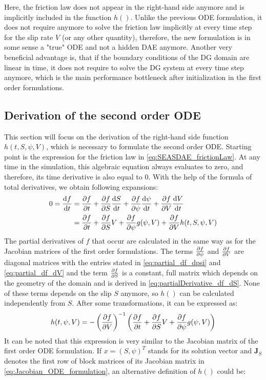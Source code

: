 Here, the friction law does not appear in the right-hand side anymore and is implicitly included in the function $h()$. Unlike the previous ODE formulation, it does not require anymore to solve the friction law implicitly at every time step for the slip rate $V$ (or any other quantity), therefore, the new formulation is in some sense a "true" ODE and not a hidden DAE anymore. Another very beneficial advantage is, that if the boundary conditions of the DG domain are linear in time, it does not require to solve the DG system at every time step anymore, which is the main performance bottleneck after initialization in the first order formulations. 

\subsection{Derivation of the second order ODE}
This section will focus on the derivation of the right-hand side function $h(t,S,\psi,V)$, which is necessary to formulate the second order ODE. Starting point is the expression for the friction law in \autoref{eq:SEASDAE_frictionLaw}. At any time in the simulation, this algebraic equation always evaluates to zero, and therefore, its time derivative is also equal to 0. With the help of the formula of total derivatives, we obtain following expansions: 
\begin{align}
	0 = \dv{f}{t} &= \pdv{f}{t} + \pdv{f}{S}\dv{S}{t} + \pdv{f}{\psi}\dv{\psi}{t} +  \pdv{f}{V}\dv{V}{t} \\
					  &= \pdv{f}{t} + \pdv{f}{S}V + \pdv{f}{\psi}g(\psi,V) + \pdv{f}{V}h(t,S,\psi,V)
\end{align}
The partial derivatives of $f$ that occur are calculated in the same way as for the Jacobian matrices of the first order formulations. The terms $\pdv{f}{\psi}$ and $\pdv{f}{V}$ are diagonal matrices with the entries stated in \autoref{eq:partial_df_dpsi} and \autoref{eq:partial_df_dV} and the term $\pdv{f}{S}$ is a constant, full matrix which depends on the geometry of the domain and is derived in \autoref{eq:partialDerivative_df_dS}. None of these terms depends on the slip $S$ anymore, so $h()$ can be calculated independently from $S$. After some transformations, it can be expressed as: 
\begin{equation}
	\label{eq:2nd_order_ODE_formulation_sum_of_Jacobians}
	h(t,\psi,V) = -\left(\pdv{f}{V}\right)^{-1}\left(\pdv{f}{t} + \pdv{f}{S}V + \pdv{f}{\psi}g(\psi,V)\right)
\end{equation}
It can be noted that this expression is very similar to the Jacobian matrix of the first order ODE formulation. If $x=(S,\psi)^T$ stands for its solution vector and $\mathbf{J}_{S}$ denotes the first row of block matrices of its Jacobian matrix in \autoref{eq:Jacobian_ODE_formulation}, an alternative definition of $h()$ could be: 
